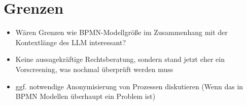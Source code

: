 \section{Grenzen}\label{sec:grenzen}

\begin{itemize}
    \item Wären Grenzen wie BPMN-Modellgröße im Zusammenhang mit der Kontextlänge des LLM interessant?
    \item Keine aussagekräftige Rechtsberatung, sondern stand jetzt eher ein Vorscreening, was nochmal überprüft werden muss
    \item ggf. notwendige Anonymisierung von Prozessen diskutieren (Wenn das in BPMN Modellen überhaupt ein Problem ist)
\end{itemize}